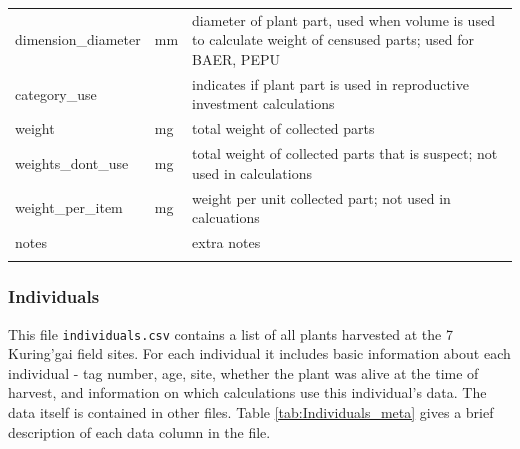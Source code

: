 \documentclass[10pt,twoside]{article}\usepackage[]{graphicx}\usepackage[]{color}
\begin{document}
\begin{longtable}{p{4cm}p{2cm}p{10cm}}
  dimension\_diameter & mm & diameter of plant part, used when volume is used to calculate weight of censused parts; used for BAER, PEPU \\ 
  category\_use &  & indicates if plant part is used in reproductive investment calculations \\ 
  weight & mg & total weight of collected parts \\ 
  weights\_dont\_use & mg & total weight of collected parts that is suspect; not used in calculations \\ 
  weight\_per\_item & mg & weight per unit collected part; not used in calcuations \\ 
  notes &  & extra notes \\ 
   \hline
\hline
\label{tab:flowerParts_meta}
\end{longtable}
\endgroup


\subsubsection{Individuals}
This file \texttt{individuals.csv} contains a list of all plants harvested at the 7 Kuring'gai field sites. For each individual it includes basic information about each individual - tag number, age, site, whether the plant was alive at the time of harvest, and information on which calculations use this individual's data. The data itself is contained in other files. Table \ref{tab:Individuals_meta} gives a brief description of each data column in the file.
\end{document}

